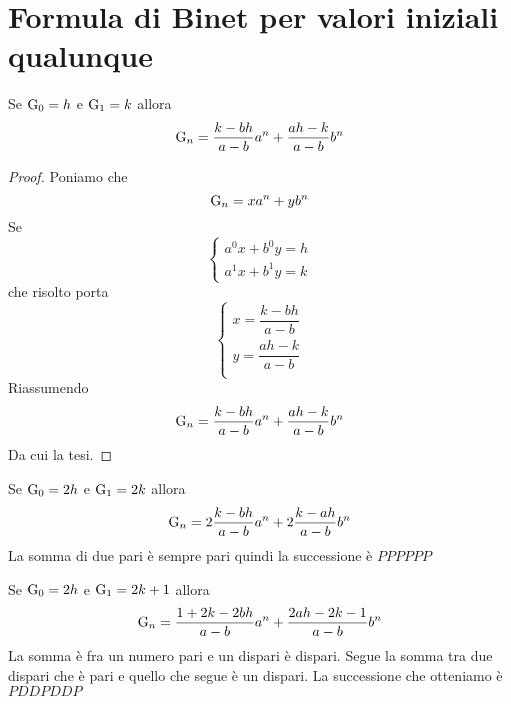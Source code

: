\section{Formula di Binet per valori iniziali qualunque}
\begin{thm}\label{thm:FormulaBinetgeneralizzata}
Se $\mathrm{G}_{0}={}h$ e $\mathrm{G}_{1}={}k$ allora
\begin{equation}
\mathrm{G}_{n}={}\dfrac{k-bh}{a-b}a^n+\dfrac{ah-k}{a-b}b^n
\end{equation}\label{eqn:FormulaBinetgeneralizzata}
\end{thm}
\begin{proof}
Poniamo che \begin{equation}
	\mathrm{G}_{n}=xa^n+yb^n
\end{equation} Se
\begin{equation*}
	\left\{
	\begin{array}{l}
		a^0x+b^0y=h\\ a^1x+b^1y=k
	\end{array}
	\right.
\end{equation*}
che risolto porta
\begin{equation*}
	\left\{
	\begin{array}{l}
		x=\dfrac{k-bh}{a-b}\\y=\dfrac{ah-k}{a-b}\\
	\end{array}
	\right.
\end{equation*}
Riassumendo
 \begin{equation*}
	\mathrm{G}_{n}={}\dfrac{k-bh}{a-b}a^n+\dfrac{ah-k}{a-b}b^n
\end{equation*}
Da cui la tesi.
\end{proof}
\begin{commento}
	Se $\mathrm{G}_{0}={}2h$ e $\mathrm{G}_{1}={}2k$ allora \begin{equation}
		\mathrm{G}_{n}={}2\dfrac{k-bh}{a-b}a^n+2\dfrac{k-ah}{a-b}b^n
	\end{equation}
La somma di due pari è sempre pari quindi la successione è $PPPPPP$
\end{commento}
\begin{commento}
	Se $\mathrm{G}_{0}={}2h$ e $\mathrm{G}_{1}={}2k+1$ allora \begin{equation}
		\mathrm{G}_{n}={}\dfrac{1+2k-2bh}{a-b}a^n+\dfrac{2ah-2k-1}{a-b }b^n
	\end{equation}
La somma è fra un numero pari e un dispari è dispari. Segue la somma tra due dispari che è pari e quello che segue è un dispari. La successione che otteniamo  è $PDDPDDP$
\end{commento}
